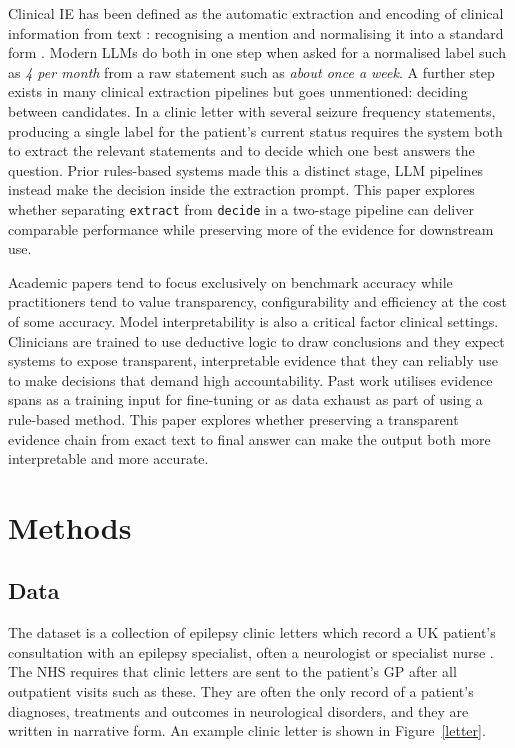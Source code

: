 \documentclass[conference]{IEEEtran}
\begin{document}
Clinical IE has been defined as the automatic extraction 
and encoding of clinical information from text \cite{b13}: 
recognising a mention and normalising it into a standard 
form \cite{b14}. Modern LLMs do both in one step when asked 
for a normalised label such as \emph{4 per month} from a raw 
statement such as \emph{about once a week}. A further step 
exists in many clinical extraction pipelines but goes 
unmentioned: deciding between candidates. In a clinic letter 
with several seizure frequency statements, producing a single 
label for the patient's current status requires the system 
both to extract the relevant statements and to decide which 
one best answers the question. Prior rules-based systems made 
this a distinct stage\cite{b15}, LLM pipelines instead make the 
decision inside the extraction prompt. This paper explores 
whether separating \texttt{extract} from \texttt{decide} in a 
two-stage pipeline can deliver comparable performance while 
preserving more of the evidence for downstream use.

Academic papers tend to focus exclusively on benchmark 
accuracy while practitioners tend to value transparency, 
configurability and efficiency at the cost of some accuracy\cite{b15, b16}. 
Model interpretability is also a critical factor clinical settings\cite{b14}. 
Clinicians are trained to use deductive logic to draw 
conclusions and they expect systems to expose transparent, 
interpretable evidence that they can reliably use to make 
decisions that demand high accountability. Past work 
utilises evidence spans as a training input\cite{b3} for 
fine-tuning or as data exhaust as part of using a rule-based 
method\cite{b4}. This paper explores whether preserving a 
transparent evidence chain from exact text to final answer 
can make the output both more interpretable and more 
accurate.

\section{Methods}
\subsection{Data}
\label{sec:data}

The dataset is a collection of epilepsy clinic letters which 
record a UK patient's consultation with an epilepsy 
specialist, often a neurologist or specialist nurse \cite{b3}. 
The NHS requires that clinic letters are sent to the 
patient's GP after all outpatient visits such as these.
They are often the only record of a patient's diagnoses,
treatments and outcomes in neurological disorders, 
and they are written in narrative form. An example clinic letter 
is shown in Figure~\ref{letter}.
\end{document}
